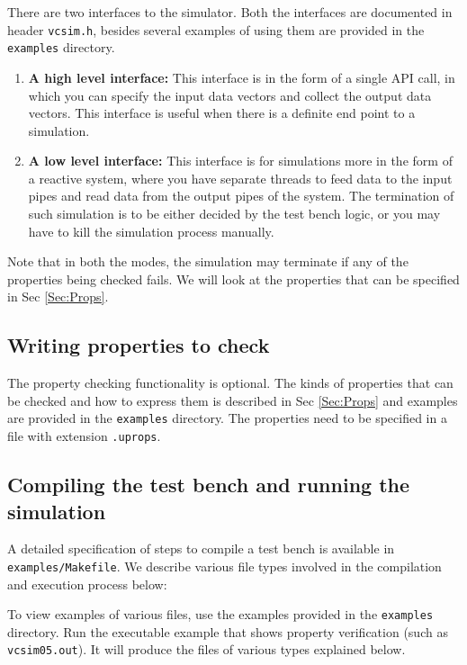 \documentclass[12pt,a4paper]{article}
\begin{document}
There are two interfaces to the simulator. Both the interfaces are documented in header \texttt{vcsim.h}, besides several examples of using them are provided in the \texttt{examples} directory.

\begin{enumerate}
\item \textbf{A high level interface:} This interface is in the form of a single API call, in which you can specify the input data vectors and collect the output data vectors. This interface is useful when there is a definite end point to a simulation.
\item \textbf{A low level interface:} This interface is for simulations more in the form of a reactive system, where you have separate threads to feed data to the input pipes and read data from the output pipes of the system. The termination of such simulation is to be either decided by the test bench logic, or you may have to kill the simulation process manually.
\end{enumerate}

Note that in both the modes, the simulation may terminate if any of the properties being checked fails. We will look at the properties that can be specified in Sec \ref{Sec:Props}.

\subsection{Writing properties to check}

The property checking functionality is optional. The kinds of properties that can be checked and how to express them is described in Sec \ref{Sec:Props} and examples are provided in the \texttt{examples} directory. The properties need to be specified in a file with extension \texttt{.uprops}.

\subsection{Compiling the test bench and running the simulation}

A detailed specification of steps to compile a test bench is available in \texttt{examples/Makefile}. We describe various file types involved in the compilation and execution process below:

To view examples of various files, use the examples provided in the \texttt{examples} directory. Run the executable example that shows property verification (such as \texttt{vcsim05.out}). It will produce the files of various types explained below.
\end{document}
